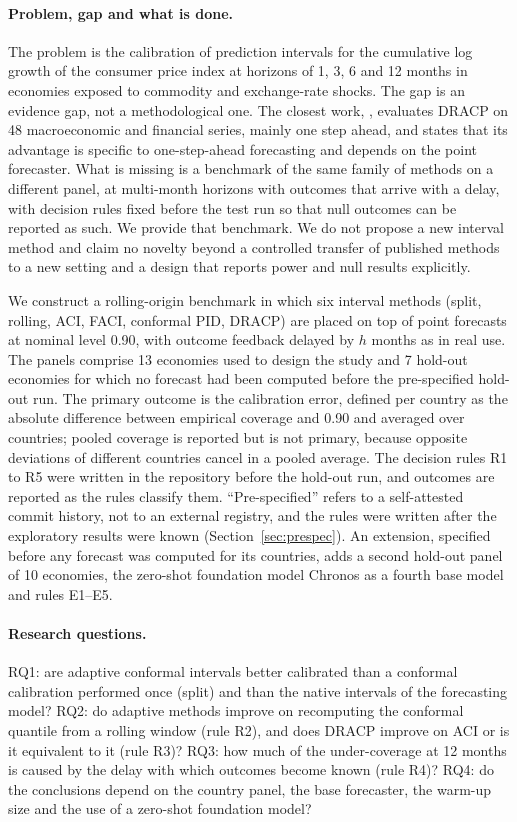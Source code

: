 \paragraph{Problem, gap and what is done.} The problem is the calibration of prediction intervals for the cumulative log growth of the consumer price index at horizons of 1, 3, 6 and 12 months in economies exposed to commodity and exchange-rate shocks. The gap is an evidence gap, not a methodological one. The closest work, \citet{oancea2026dracp}, evaluates DRACP on 48 macroeconomic and financial series, mainly one step ahead, and states that its advantage is specific to one-step-ahead forecasting and depends on the point forecaster. What is missing is a benchmark of the same family of methods on a different panel, at multi-month horizons with outcomes that arrive with a delay, with decision rules fixed before the test run so that null outcomes can be reported as such. We provide that benchmark. We do not propose a new interval method and claim no novelty beyond a controlled transfer of published methods to a new setting and a design that reports power and null results explicitly.

We construct a rolling-origin benchmark in which six interval methods (split, rolling, ACI, FACI, conformal PID, DRACP) are placed on top of point forecasts at nominal level 0.90, with outcome feedback delayed by $h$ months as in real use. The panels comprise 13 economies used to design the study and 7 hold-out economies for which no forecast had been computed before the pre-specified hold-out run. The primary outcome is the calibration error, defined per country as the absolute difference between empirical coverage and 0.90 and averaged over countries; pooled coverage is reported but is not primary, because opposite deviations of different countries cancel in a pooled average. The decision rules R1 to R5 were written in the repository before the hold-out run, and outcomes are reported as the rules classify them. ``Pre-specified'' refers to a self-attested commit history, not to an external registry, and the rules were written after the exploratory results were known (Section~\ref{sec:prespec}). An extension, specified before any forecast was computed for its countries, adds a second hold-out panel of 10 economies, the zero-shot foundation model Chronos as a fourth base model and rules E1--E5.

\paragraph{Research questions.} RQ1: are adaptive conformal intervals better calibrated than a conformal calibration performed once (split) and than the native intervals of the forecasting model? RQ2: do adaptive methods improve on recomputing the conformal quantile from a rolling window (rule R2), and does DRACP improve on ACI or is it equivalent to it (rule R3)? RQ3: how much of the under-coverage at 12 months is caused by the delay with which outcomes become known (rule R4)? RQ4: do the conclusions depend on the country panel, the base forecaster, the warm-up size and the use of a zero-shot foundation model?

